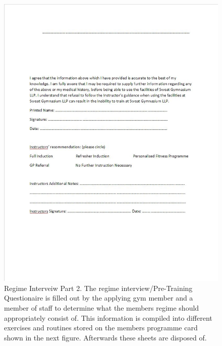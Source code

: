 \begin{figure}[H]
    \includegraphics[width=\textwidth]{RegimeInterveiw2.JPG}
    \caption{Regime Interveiw Part 2. The regime interview/Pre-Training Questionaire is filled out by the applying gym member and a member of staff to determine what the members regime should appropriately consist of. This information is compiled into different exercises and routines stored on the members programme card shown in the next figure. Afterwards these sheets are disposed of. } \label{fig:Regime Interveiw Part 2}
\end{figure}

